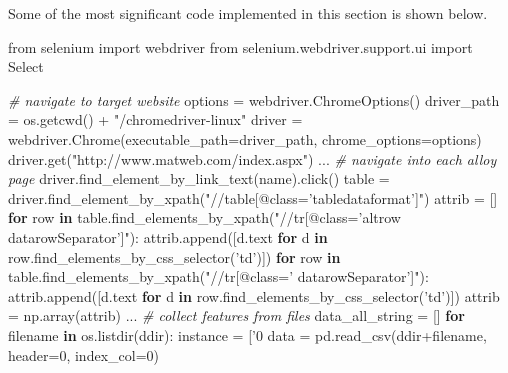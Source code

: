 \documentclass[11pt]{article}
\newenvironment{Shaded}{}{}
\newcommand{\KeywordTok}[1]{\textcolor[rgb]{0.00,0.44,0.13}{\textbf{{#1}}}}
\newcommand{\DecValTok}[1]{\textcolor[rgb]{0.25,0.63,0.44}{{#1}}}
\newcommand{\StringTok}[1]{\textcolor[rgb]{0.25,0.44,0.63}{{#1}}}
\newcommand{\CommentTok}[1]{\textcolor[rgb]{0.38,0.63,0.69}{\textit{{#1}}}}
\newcommand{\NormalTok}[1]{{#1}}
\newcommand{\ImportTok}[1]{{#1}}
\newcommand{\ControlFlowTok}[1]{\textcolor[rgb]{0.00,0.44,0.13}{\textbf{{#1}}}}
\newcommand{\OperatorTok}[1]{\textcolor[rgb]{0.40,0.40,0.40}{{#1}}}
\newcommand{\BuiltInTok}[1]{{#1}}
\begin{document}
Some of the most significant code implemented in this section is shown
below.

    \begin{Shaded}
\begin{Highlighting}[]
\ImportTok{from}\NormalTok{ selenium }\ImportTok{import}\NormalTok{ webdriver}
\ImportTok{from}\NormalTok{ selenium.webdriver.support.ui }\ImportTok{import}\NormalTok{ Select}

\CommentTok{# navigate to target website}
\NormalTok{options }\OperatorTok{=}\NormalTok{ webdriver.ChromeOptions()}
\NormalTok{driver_path }\OperatorTok{=}\NormalTok{ os.getcwd() }\OperatorTok{+} \StringTok{"/chromedriver-linux"}
\NormalTok{driver }\OperatorTok{=}\NormalTok{ webdriver.Chrome(executable_path}\OperatorTok{=}\NormalTok{driver_path, chrome_options}\OperatorTok{=}\NormalTok{options)}
\NormalTok{driver.get(}\StringTok{"http://www.matweb.com/index.aspx"}\NormalTok{)}
\NormalTok{...}
\CommentTok{# navigate into each alloy page}
\NormalTok{driver.find_element_by_link_text(name).click()}
\NormalTok{table }\OperatorTok{=}\NormalTok{ driver.find_element_by_xpath(}\StringTok{"//table[@class='tabledataformat']"}\NormalTok{)}
\NormalTok{attrib }\OperatorTok{=}\NormalTok{ []}
\ControlFlowTok{for}\NormalTok{ row }\KeywordTok{in}\NormalTok{ table.find_elements_by_xpath(}\StringTok{"//tr[@class='altrow datarowSeparator']"}\NormalTok{):}
\NormalTok{    attrib.append([d.text }\ControlFlowTok{for}\NormalTok{ d }\KeywordTok{in}\NormalTok{ row.find_elements_by_css_selector(}\StringTok{'td'}\NormalTok{)])}
    \ControlFlowTok{for}\NormalTok{ row }\KeywordTok{in}\NormalTok{ table.find_elements_by_xpath(}\StringTok{"//tr[@class=' datarowSeparator']"}\NormalTok{):}
\NormalTok{        attrib.append([d.text }\ControlFlowTok{for}\NormalTok{ d }\KeywordTok{in}\NormalTok{ row.find_elements_by_css_selector(}\StringTok{'td'}\NormalTok{)])}
\NormalTok{attrib }\OperatorTok{=}\NormalTok{ np.array(attrib)}
\NormalTok{...}
\CommentTok{# collect features from files}
\NormalTok{data_all_string }\OperatorTok{=}\NormalTok{ []}
\ControlFlowTok{for}\NormalTok{ filename }\KeywordTok{in}\NormalTok{ os.listdir(ddir):}
\NormalTok{    instance }\OperatorTok{=}\NormalTok{ [}\StringTok{'0%'}\NormalTok{]}\OperatorTok{*}\BuiltInTok{len}\NormalTok{(elem_list) }\OperatorTok{+}\NormalTok{ [}\StringTok{'NA'}\NormalTok{]}\OperatorTok{*}\BuiltInTok{len}\NormalTok{(prop_list) }\CommentTok{# initialize instance row}
\NormalTok{    data }\OperatorTok{=}\NormalTok{ pd.read_csv(ddir}\OperatorTok{+}\NormalTok{filename, header}\OperatorTok{=}\DecValTok{0}\NormalTok{, index_col}\OperatorTok{=}\DecValTok{0}\NormalTok{)}
}
\end{Highlighting}
\end{Shaded}
\end{document}
